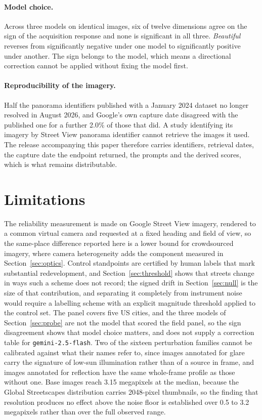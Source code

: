 \paragraph{Model choice.}
Across three models on identical images, six of twelve dimensions agree on the
sign of the acquisition response and none is significant in all three.
\emph{Beautiful} reverses from significantly negative under one model to
significantly positive under another. The sign belongs to the model, which means
a directional correction cannot be applied without fixing the model first.

\paragraph{Reproducibility of the imagery.}
Half the panorama identifiers published with a January 2024 dataset no longer
resolved in August 2026, and Google's own capture date disagreed with the
published one for a further 2.0\% of those that did. A study identifying its
imagery by Street View panorama identifier cannot retrieve the images it used.
The release accompanying this paper therefore carries identifiers, retrieval
dates, the capture date the endpoint returned, the prompts and the derived
scores, which is what remains distributable.

\section{Limitations}

The reliability measurement is made on Google Street View imagery, rendered to a
common virtual camera and requested at a fixed heading and field of view, so the
same-place difference reported here is a lower bound for crowdsourced imagery,
where camera heterogeneity adds the component measured in
Section~\ref{sec:optics}. Control standpoints are certified by human labels that
mark substantial redevelopment, and Section~\ref{sec:threshold} shows that
streets change in ways such a scheme does not record; the signed drift in
Section~\ref{sec:null} is the size of that contribution, and separating it
completely from instrument noise would require a labelling scheme with an
explicit magnitude threshold applied to the control set. The panel covers five
US cities, and the three models of Section~\ref{sec:probe} are not the model
that scored the field panel, so the sign disagreement shows that model choice
matters, and does not supply a correction table for \texttt{gemini-2.5-flash}. Two of the sixteen perturbation families cannot be
calibrated against what their names refer to, since images annotated for glare
carry the signature of low-sun illumination rather than of a source in frame,
and images annotated for reflection have the same whole-frame profile as those
without one. Base images reach 3.15 megapixels at the median, because the Global
Streetscapes distribution carries 2048-pixel thumbnails, so the finding that
resolution produces no effect above the noise floor is established over 0.5 to
3.2 megapixels rather than over the full observed range.
